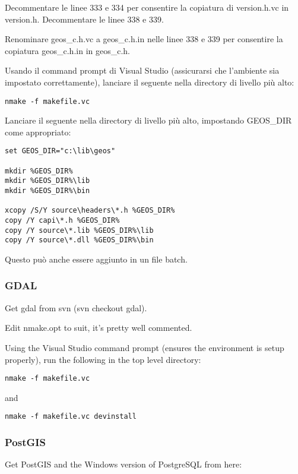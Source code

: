Decommentare le linee 333 e 334 per consentire la copiatura di version.h.vc in version.h.
Decommentare le linee 338 e 339.

Renominare geos\_c.h.vc a geos\_c.h.in nelle linee 338 e 339 per consentire la copiatura geos\_c.h.in in geos\_c.h.

Usando il command prompt di Visual Studio (assicurarsi che l'ambiente sia impostato correttamente), lanciare il seguente nella directory di livello più alto:

\begin{verbatim}
nmake -f makefile.vc 
\end{verbatim}

Lanciare il seguente nella directory di livello più alto, impostando GEOS\_DIR come appropriato:

\begin{verbatim}
set GEOS_DIR="c:\lib\geos"

mkdir %GEOS_DIR%
mkdir %GEOS_DIR%\lib
mkdir %GEOS_DIR%\bin

xcopy /S/Y source\headers\*.h %GEOS_DIR%
copy /Y capi\*.h %GEOS_DIR%
copy /Y source\*.lib %GEOS_DIR%\lib
copy /Y source\*.dll %GEOS_DIR%\bin
\end{verbatim}

Questo può anche essere aggiunto in un file batch.

\subsubsection{GDAL}
Get gdal from svn (svn checkout  gdal).

Edit nmake.opt to suit, it's pretty well commented.

Using the Visual Studio command prompt (ensures the environment is setup properly), run the following in the top level directory:

\begin{verbatim}
nmake -f makefile.vc 
\end{verbatim}

and

\begin{verbatim}
nmake -f makefile.vc devinstall 
\end{verbatim}

\subsubsection{PostGIS}
Get PostGIS and the Windows version of PostgreSQL from here:

